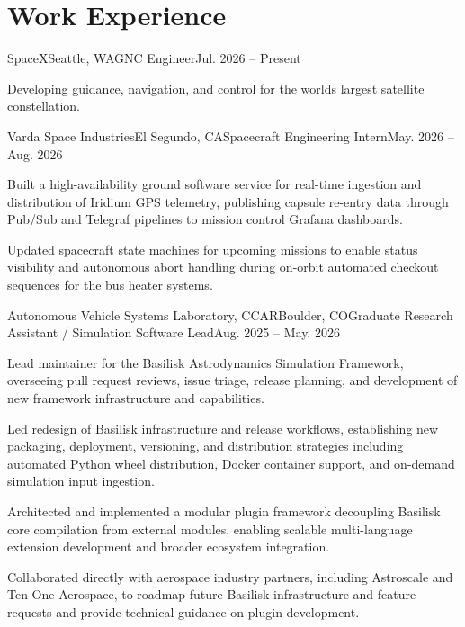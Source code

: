 \documentclass{techresume}
\begin{document}
\makeheader

\section{Work Experience}

\begin{job}{SpaceX}{Seattle, WA}{GNC Engineer}{Jul. 2026 -- Present}
  \item Developing guidance, navigation, and control for the worlds largest satellite constellation.
\end{job}

\begin{job}{Varda Space Industries}{El Segundo, CA}{Spacecraft Engineering Intern}{May. 2026 -- Aug. 2026}
  \item Built a high-availability ground software service for real-time ingestion and distribution of Iridium GPS telemetry, publishing capsule re-entry data through Pub/Sub and Telegraf pipelines to mission control Grafana dashboards.
  \item Updated spacecraft state machines for upcoming missions to enable status visibility and autonomous abort handling during on-orbit automated checkout sequences for the bus heater systems.
\end{job}

\begin{job}{Autonomous Vehicle Systems Laboratory, CCAR}{Boulder, CO}{Graduate Research Assistant / Simulation Software Lead}{Aug. 2025 -- May. 2026}
  \item Lead maintainer for the Basilisk Astrodynamics Simulation Framework, overseeing pull request reviews, issue triage, release planning, and development of new framework infrastructure and capabilities.
  \item Led redesign of Basilisk infrastructure and release workflows, establishing new packaging, deployment, versioning, and distribution strategies including automated Python wheel distribution, Docker container support, and on-demand simulation input ingestion.
  \item Architected and implemented a modular plugin framework decoupling Basilisk core compilation from external modules, enabling scalable multi-language extension development and broader ecosystem integration.
  \item Collaborated directly with aerospace industry partners, including Astroscale and Ten One Aerospace, to roadmap future Basilisk infrastructure and feature requests and provide technical guidance on plugin development.
\end{job}
\end{document}
